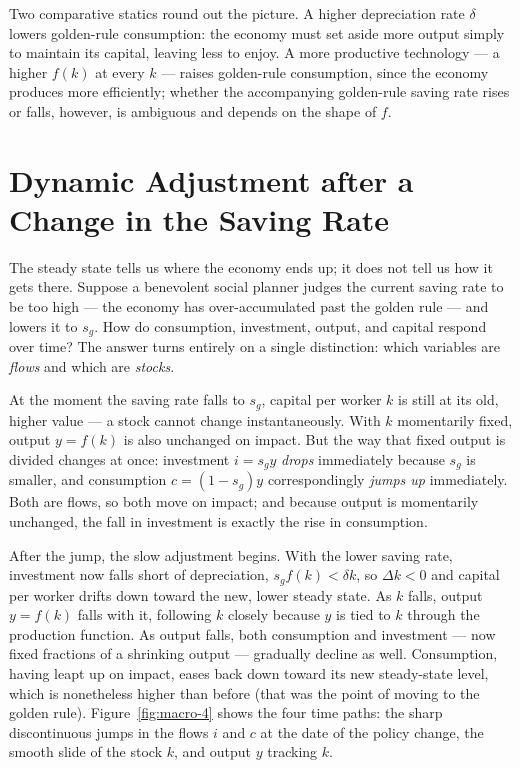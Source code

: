 Two comparative statics round out the picture. A higher depreciation rate $\delta$ lowers golden-rule consumption: the economy must set aside more output simply to maintain its capital, leaving less to enjoy. A more productive technology --- a higher $f(k)$ at every $k$ --- raises golden-rule consumption, since the economy produces more efficiently; whether the accompanying golden-rule saving rate rises or falls, however, is ambiguous and depends on the shape of $f$.

\section{Dynamic Adjustment after a Change in the Saving Rate}

The steady state tells us where the economy ends up; it does not tell us how it gets there. Suppose a benevolent social planner judges the current saving rate to be too high --- the economy has over-accumulated past the golden rule --- and lowers it to $s_g$. How do consumption, investment, output, and capital respond over time? The answer turns entirely on a single distinction: which variables are \emph{flows} and which are \emph{stocks}.


At the moment the saving rate falls to $s_g$, capital per worker $k$ is still at its old, higher value --- a stock cannot change instantaneously. With $k$ momentarily fixed, output $y = f(k)$ is also unchanged on impact. But the way that fixed output is divided changes at once: investment $i = s_g y$ \emph{drops} immediately because $s_g$ is smaller, and consumption $c = (1 - s_g) y$ correspondingly \emph{jumps up} immediately. Both are flows, so both move on impact; and because output is momentarily unchanged, the fall in investment is exactly the rise in consumption.

After the jump, the slow adjustment begins. With the lower saving rate, investment now falls short of depreciation, $s_g f(k) < \delta k$, so $\Delta k < 0$ and capital per worker drifts down toward the new, lower steady state. As $k$ falls, output $y = f(k)$ falls with it, following $k$ closely because $y$ is tied to $k$ through the production function. As output falls, both consumption and investment --- now fixed fractions of a shrinking output --- gradually decline as well. Consumption, having leapt up on impact, eases back down toward its new steady-state level, which is nonetheless higher than before (that was the point of moving to the golden rule). Figure~\ref{fig:macro-4} shows the four time paths: the sharp discontinuous jumps in the flows $i$ and $c$ at the date of the policy change, the smooth slide of the stock $k$, and output $y$ tracking $k$.

